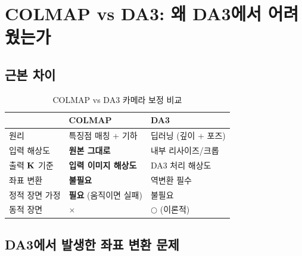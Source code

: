 \documentclass[11pt, a4paper]{report}
\theoremstyle{definition}
\theoremstyle{remark}
\begin{document}
\chapter{COLMAP vs DA3: 왜 DA3에서 어려웠는가}

\section{근본 차이}

\begin{table}[H]
\centering
\caption{COLMAP vs DA3 카메라 보정 비교}
\renewcommand{\arraystretch}{1.4}
\begin{tabularx}{\textwidth}{lXX}
\toprule
& \textbf{COLMAP} & \textbf{DA3} \\
\midrule
원리 & 특징점 매칭 + 기하 & 딥러닝 (깊이 + 포즈) \\
입력 해상도 & \textbf{원본 그대로} & 내부 리사이즈/크롭 \\
출력 $\mathbf{K}$ 기준 & \textbf{입력 이미지 해상도} & DA3 처리 해상도 \\
좌표 변환 & \textbf{불필요} & 역변환 필수 \\
정적 장면 가정 & \textbf{필요} (움직이면 실패) & 불필요 \\
동적 장면 & $\times$ & $\bigcirc$ (이론적) \\
\bottomrule
\end{tabularx}
\end{table}

\section{DA3에서 발생한 좌표 변환 문제}
\end{document}
